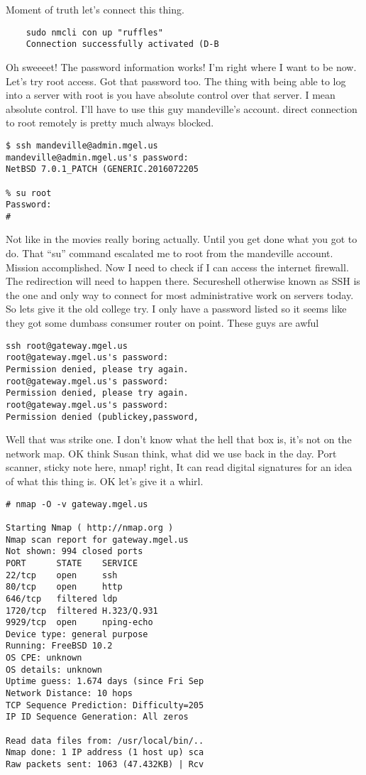 Moment of truth let's connect this thing.

\begin{verbatim}
	sudo nmcli con up "ruffles"
	Connection successfully activated (D-B
\end{verbatim}
\medskip

Oh sweeeet! The password information works! I'm right where I want to be now. Let's try root access. Got that password too. The thing with being able to log into a server with root is you have absolute control over that server. I mean absolute control. I'll have to use this guy mandeville's account. direct connection to root remotely is pretty much always blocked.

\begin{verbatim}
$ ssh mandeville@admin.mgel.us
mandeville@admin.mgel.us's password: 
NetBSD 7.0.1_PATCH (GENERIC.2016072205

% su root
Password:
# 
\end{verbatim}
\medskip

Not like in the movies really boring actually. Until you get done what you got to do. That ``su'' command escalated me to root from the mandeville account. Mission accomplished. Now I need to check if I can access the internet firewall. The redirection will need to happen there. Secureshell otherwise known as SSH is the one and only way to connect for most administrative work on servers today. So lets give it the old college try. I only have a password listed so it seems like they got some dumbass consumer router on point. These guys are awful

\begin{verbatim}
ssh root@gateway.mgel.us
root@gateway.mgel.us's password: 
Permission denied, please try again.
root@gateway.mgel.us's password: 
Permission denied, please try again.
root@gateway.mgel.us's password: 
Permission denied (publickey,password,
\end{verbatim}

Well that was strike one. I don't know what the hell that box is, it's not on the network map. OK think Susan think, what did we use back in the day. Port scanner, sticky note here, nmap! right, It can read digital signatures for an idea of what this thing is. OK let's give it a whirl.

\begin{verbatim}
# nmap -O -v gateway.mgel.us

Starting Nmap ( http://nmap.org )
Nmap scan report for gateway.mgel.us 
Not shown: 994 closed ports
PORT      STATE    SERVICE
22/tcp    open     ssh
80/tcp    open     http
646/tcp   filtered ldp
1720/tcp  filtered H.323/Q.931
9929/tcp  open     nping-echo
Device type: general purpose
Running: FreeBSD 10.2
OS CPE: unknown
OS details: unknown
Uptime guess: 1.674 days (since Fri Sep
Network Distance: 10 hops
TCP Sequence Prediction: Difficulty=205
IP ID Sequence Generation: All zeros

Read data files from: /usr/local/bin/..
Nmap done: 1 IP address (1 host up) sca
Raw packets sent: 1063 (47.432KB) | Rcv
\end{verbatim}

